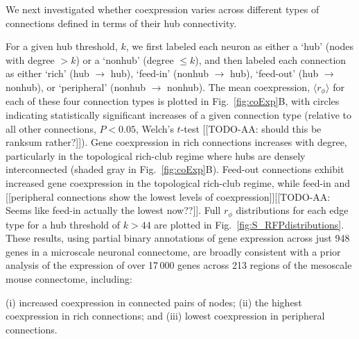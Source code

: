 \documentclass[10pt,letterpaper]{article}
\begin{document}
We next investigated whether coexpression varies across different types of connections defined in terms of their hub connectivity.

For a given hub threshold, $k$, we first labeled each neuron as either a `hub' (nodes with degree $> k$) or a `nonhub' (degree $\leq k$), and then labeled each connection as either `rich' (hub $\rightarrow$ hub), `feed-in' (nonhub $\rightarrow$ hub), `feed-out' (hub $\rightarrow$ nonhub), or `peripheral' (nonhub $\rightarrow$ nonhub).
The mean coexpression, $\langle r_\phi \rangle$ for each of these four connection types is plotted in Fig.~\ref{fig:coExp}B, with circles indicating statistically significant increases of a given connection type (relative to all other connections, $P < 0.05$, Welch's $t$-test [[TODO-AA: should this be ranksum rather?]]).
Gene coexpression in rich connections increases with degree, particularly in the topological rich-club regime where hubs are densely interconnected (shaded gray in Fig.~\ref{fig:coExp}B).
Feed-out connections exhibit increased gene coexpression in the topological rich-club regime, while feed-in and [[peripheral connections show the lowest levels of coexpression]][[TODO-AA: Seems like feed-in actually the lowest now??]].
Full $r_\phi$ distributions for each edge type for a hub threshold of $k > 44$ are plotted in Fig.~\ref{fig:S_RFPdistributions}.
These results, using partial binary annotations of gene expression across just 948 genes in a microscale neuronal connectome, are broadly consistent with a prior analysis of the expression of over 17\,000 genes across 213 regions of the mesoscale mouse connectome, including:

(i) increased coexpression in connected pairs of nodes;
(ii) the highest coexpression in rich connections; and
(iii) lowest coexpression in peripheral connections.
\end{document}
